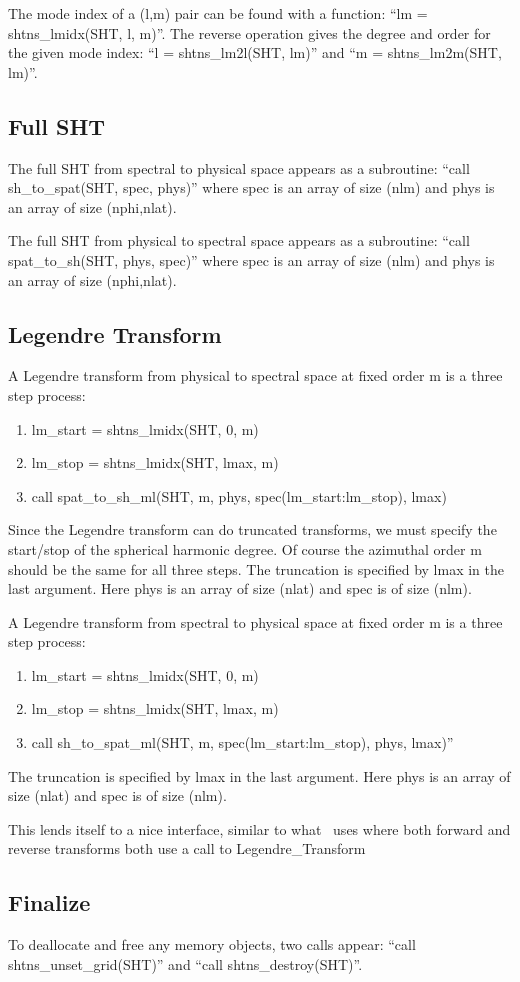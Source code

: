 \documentclass[10pt,letterpaper]{article}
\begin{document}
The mode index of a (l,m) pair can be found with a function:
``lm = shtns\_lmidx(SHT, l, m)''. The reverse operation gives the degree and order for
the given mode index: ``l = shtns\_lm2l(SHT, lm)'' and ``m = shtns\_lm2m(SHT, lm)''.

\subsection{Full SHT}
The full SHT from spectral to physical space appears as a subroutine:
``call sh\_to\_spat(SHT, spec, phys)'' where spec is an array of size (nlm) and
phys is an array of size (nphi,nlat).

The full SHT from physical to spectral space appears as a subroutine:
``call spat\_to\_sh(SHT, phys, spec)'' where spec is an array of size (nlm) and
phys is an array of size (nphi,nlat).

\subsection{Legendre Transform}
A Legendre transform from physical to spectral space at fixed order m is a three
step process:
\begin{enumerate}
  \item lm\_start = shtns\_lmidx(SHT, 0, m)
  \item lm\_stop = shtns\_lmidx(SHT, lmax, m)
  \item call spat\_to\_sh\_ml(SHT, m, phys, spec(lm\_start:lm\_stop), lmax)
\end{enumerate}
Since the Legendre transform can do truncated transforms, we must specify the start/stop
of the spherical harmonic degree. Of course the azimuthal order m should be the same
for all three steps. The truncation is specified by lmax in the last argument. Here
phys is an array of size (nlat) and spec is of size (nlm).

A Legendre transform from spectral to physical space at fixed order m is a three
step process:
\begin{enumerate}
  \item lm\_start = shtns\_lmidx(SHT, 0, m)
  \item lm\_stop = shtns\_lmidx(SHT, lmax, m)
  \item call sh\_to\_spat\_ml(SHT, m, spec(lm\_start:lm\_stop), phys, lmax)''
\end{enumerate}
The truncation is specified by lmax in the last argument. Here
phys is an array of size (nlat) and spec is of size (nlm).

This lends itself to a nice interface, similar to what \rayleigh\ uses where both
forward and reverse transforms both use a call to Legendre\_Transform


\subsection{Finalize \shtns}
To deallocate and free any memory objects, two calls appear:
``call shtns\_unset\_grid(SHT)'' and ``call shtns\_destroy(SHT)''.
\end{document}
